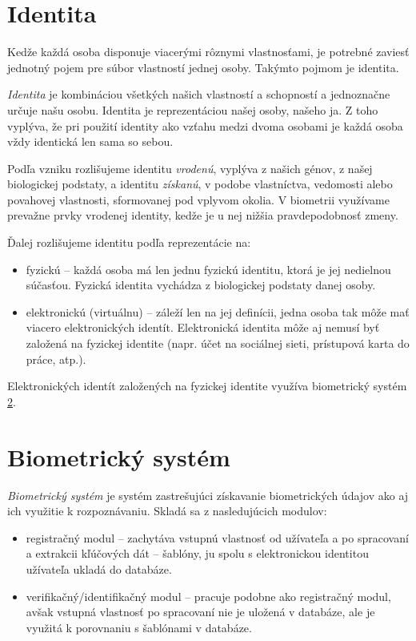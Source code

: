 \section{Identita}
Kedže každá osoba disponuje viacerými rôznymi vlastnosťami, je potrebné zaviesť jednotný pojem pre súbor vlastností jednej osoby. Takýmto pojmom je identita. 

\emph{Identita} je kombináciou všetkých našich vlastností a schopností a jednoznačne určuje našu osobu\cite{bio}. Identita je reprezentáciou našej osoby, našeho ja. Z toho vyplýva, že pri použití identity ako vzťahu medzi dvoma osobami je každá osoba vždy identická len sama so sebou.

Podľa vzniku rozlišujeme identitu \emph{vrodenú}, vyplýva z našich génov, z našej biologickej podstaty, a identitu \emph{získanú}, v podobe vlastníctva, vedomosti alebo povahovej vlastnosti, sformovanej pod vplyvom okolia. V biometrii využívame prevažne prvky vrodenej identity, kedže je u nej nižšia pravdepodobnosť zmeny.

Ďalej rozlišujeme identitu podľa reprezentácie na:
\begin{itemize}
\item fyzickú -- každá osoba má len jednu fyzickú identitu, ktorá je jej nedielnou súčasťou. Fyzická identita vychádza z biologickej podstaty danej osoby.
\item elektronickú (virtuálnu) -- záleží len na jej definícii, jedna osoba tak môže mať viacero elektronických identít. Elektronická identita môže aj nemusí byť založená na fyzickej identite (napr. účet na sociálnej sieti, prístupová karta do práce, atp.).
\end{itemize}

Elektronických identít založených na fyzickej identite využíva biometrický systém \ref{sec:biosys}.

\section{Biometrický systém}\label{sec:biosys}
\emph{Biometrický systém} je systém zastrešujúci získavanie biometrických údajov ako aj ich využitie k rozpoznávaniu.
Skladá sa z nasledujúcich modulov\cite{bio}:
\begin{itemize}
\item registračný modul -- zachytáva vstupnú vlastnosť od užívateľa a po spracovaní a extrakcii kľúčových dát -- šablóny, ju spolu s elektronickou identitou užívateľa ukladá do databáze.
\item verifikačný/identifikačný modul -- pracuje podobne ako registračný modul, avšak vstupná vlastnosť po spracovaní nie je uložená v databáze, ale je využitá k porovnaniu s šablónami v databáze.
\end{itemize}

